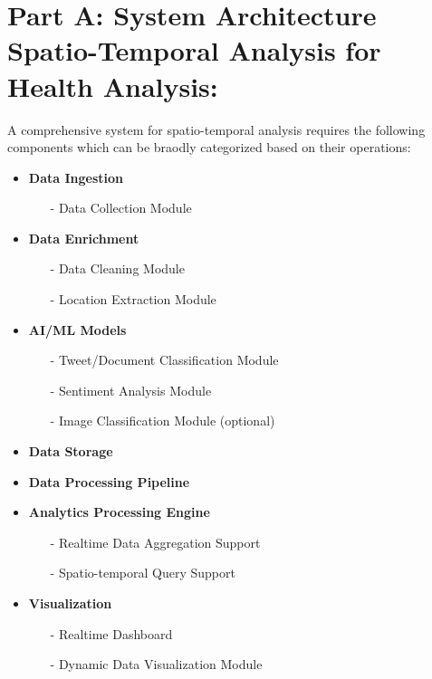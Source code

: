 \section{Part A: System Architecture  Spatio-Temporal Analysis for Health Analysis:}
\label{part_a}
A comprehensive system for spatio-temporal analysis requires the following components which can be braodly categorized based on their operations:

\begin{itemize}
  \item \textbf{Data Ingestion}
    {\em
    \begin{itemize}
      \item[-] Data Collection Module
    \end{itemize}
    }
  \item \textbf{Data Enrichment}
    {\em
    \begin{itemize}
    \item[-] Data Cleaning Module
    \item[-] Location Extraction Module
    \end{itemize}
    }
  \item \textbf{AI/ML Models}
    {\em
    \begin{itemize}
      \item[-] Tweet/Document Classification Module
      \item[-] Sentiment Analysis Module
      \item[-] Image Classification Module (optional)
    \end{itemize}
    }
  \item \textbf{Data Storage}
  \item \textbf{Data Processing Pipeline}
  \item \textbf{Analytics Processing Engine}
    {\em
    \begin{itemize}
      \item[-] Realtime Data Aggregation Support
      \item[-] Spatio-temporal Query Support
    \end{itemize}
    }
  \item \textbf{Visualization}
    {\em
    \begin{itemize}
      \item[-] Realtime Dashboard
      \item[-] Dynamic Data Visualization Module
    \end{itemize}
    }
\end{itemize}

